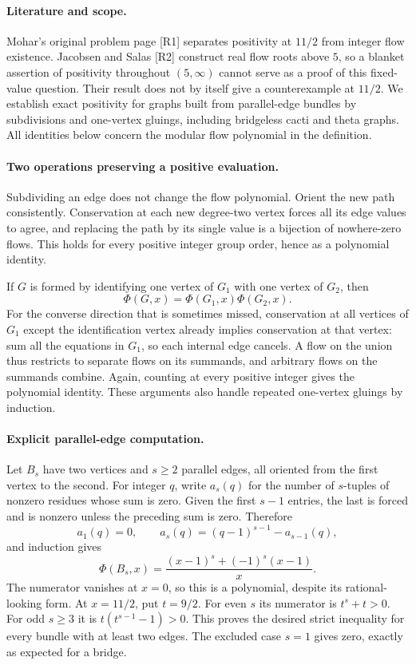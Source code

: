 \documentclass[11pt,a4paper]{article}
\begin{document}
\paragraph{Literature and scope.}
Mohar's original problem page [R1] separates positivity at $11/2$ from
integer flow existence. Jacobsen and Salas [R2] construct real flow roots
above $5$, so a blanket assertion of positivity throughout $(5,\infty)$
cannot serve as a proof of this fixed-value question. Their result does
not by itself give a counterexample at $11/2$. We establish exact
positivity for graphs built from parallel-edge bundles by subdivisions
and one-vertex gluings, including bridgeless cacti and theta graphs.
All identities below concern the modular flow polynomial in the definition.

\paragraph{Two operations preserving a positive evaluation.}
Subdividing an edge does not change the flow polynomial. Orient the new
path consistently. Conservation at each new degree-two vertex forces
all its edge values to agree, and replacing the path by its single
value is a bijection of nowhere-zero flows. This holds for every
positive integer group order, hence as a polynomial identity.

If $G$ is formed by identifying one vertex of $G_1$ with one vertex
of $G_2$, then
\[
 \Phi(G,x)=\Phi(G_1,x)\Phi(G_2,x).
\]
For the converse direction that is sometimes missed, conservation at
all vertices of $G_1$ except the identification vertex already implies
conservation at that vertex: sum all the equations in $G_1$, so each
internal edge cancels. A flow on the union thus restricts to separate
flows on its summands, and arbitrary flows on the summands combine.
Again, counting at every positive integer gives the polynomial identity.
These arguments also handle repeated one-vertex gluings by induction.

\paragraph{Explicit parallel-edge computation.}
Let $B_s$ have two vertices and $s\ge2$ parallel edges, all oriented
from the first vertex to the second. For integer $q$, write $a_s(q)$
for the number of $s$-tuples of nonzero residues whose sum is zero.
Given the first $s-1$ entries, the last is forced and is nonzero unless
the preceding sum is zero. Therefore
\[
 a_1(q)=0,\qquad a_s(q)=(q-1)^{s-1}-a_{s-1}(q),
\]
and induction gives
\[
 \Phi(B_s,x)=\frac{(x-1)^s+(-1)^s(x-1)}{x}.
\]
The numerator vanishes at $x=0$, so this is a polynomial, despite its
rational-looking form. At $x=11/2$, put $t=9/2$. For even $s$ its
numerator is $t^s+t>0$. For odd $s\ge3$ it is
$t(t^{s-1}-1)>0$. This proves the desired strict inequality for every
bundle with at least two edges. The excluded case $s=1$ gives zero,
exactly as expected for a bridge.
\end{document}
